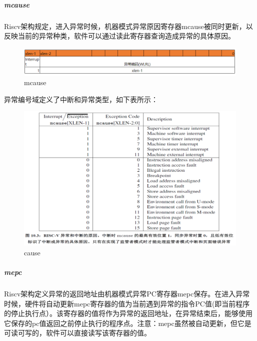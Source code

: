 \subparagraph{mcause}
Riscv架构规定，进入异常时候，机器模式异常原因寄存器mcause被同时更新，以反映当前的异常种类，软件可以通过读此寄存器查询造成异常的具体原因。

\begin{figure}[H] %
    \centering %
    \includegraphics[width=1.0\textwidth]{figs/mcause.png} %
    \caption{mcause} %
    \label{Fig.4} %
\end{figure}

异常编号域定义了中断和异常类型，如下表所示：

\begin{figure}[H] %
    \centering %
    \includegraphics[width=1.0\textwidth]{figs/cause.png} %
    \caption{cause} %
    \label{Fig.5} %
\end{figure}

\subparagraph{mepc}
Riscv架构定义异常的返回地址由机器模式异常PC寄存器mepc保存。在进入异常时候，硬件将自动更新mepc寄存器的值为当前遇到异常的指令PC值(即当前程序的停止执行点）。该寄存器的值将作为异常的返回地址，在异常结束后，能够使用它保存的pc值返回之前停止执行的程序点。注意：mepc虽然被自动更新，但它是可读可写的，软件可以直接读写该寄存器的值。

